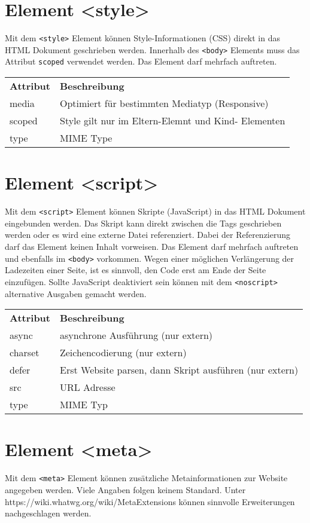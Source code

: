 \section{Element <style>}
Mit dem \texttt{<style>} Element können Style-Informationen (CSS) direkt in das HTML Dokument geschrieben werden. Innerhalb des \texttt{<body>} Elements muss das Attribut \texttt{scoped} verwendet werden. Das Element darf mehrfach auftreten.\\[1em]
\begin{tabular}{p{4cm} l}
\textbf{Attribut}	&\textbf{Beschreibung}\\
media		&Optimiert für bestimmten Mediatyp (Responsive)\\
scoped		&Style gilt nur im Eltern-Elemnt und Kind- Elementen\\
type			&MIME Type\\
\end{tabular}
\section{Element <script>}
Mit dem \texttt{<script>} Element können Skripte (JavaScript) in das HTML Dokument eingebunden werden. Das Skript kann direkt zwischen die Tags geschrieben werden oder es wird eine externe Datei referenziert. Dabei der Referenzierung darf das Element keinen Inhalt vorweisen. Das Element darf mehrfach auftreten und ebenfalls im \texttt{<body>} vorkommen. Wegen einer möglichen Verlängerung der Ladezeiten einer Seite, ist es sinnvoll, den Code erst am Ende der Seite einzufügen. Sollte JavaScript deaktiviert sein können mit dem \texttt{<noscript>} alternative Ausgaben gemacht werden.\\[1em]
\begin{tabular}{p{4cm} l}
\textbf{Attribut}	&\textbf{Beschreibung}\\
async			&asynchrone Ausführung (nur extern)\\
charset		&Zeichencodierung (nur extern)\\
defer			&Erst Website parsen, dann Skript ausführen (nur extern)\\
src			&URL Adresse\\
type			&MIME Typ\\
\end{tabular}
\section{Element <meta>}
Mit dem \texttt{<meta>} Element können zusätzliche Metainformationen zur Website angegeben werden. Viele Angaben folgen keinem Standard. Unter https://wiki.whatwg.org/wiki/MetaExtensions können sinnvolle Erweiterungen nachgeschlagen werden.
